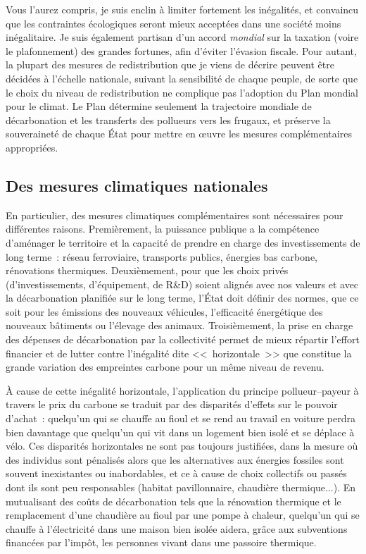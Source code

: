 \documentclass[a5paper,french,openany]{memoir}
\begin{document}
Vous l'aurez compris, je suis enclin à limiter fortement les inégalités, et convaincu que les contraintes écologiques seront mieux acceptées dans une société moins inégalitaire. Je suis également partisan d'un accord \textit{mondial} sur la taxation (voire le plafonnement) des grandes fortunes, afin d'éviter l'évasion fiscale. Pour autant, la plupart des mesures de redistribution que je viens de décrire peuvent être décidées à l'échelle nationale, suivant la sensibilité de chaque peuple, de sorte que le choix du niveau de redistribution ne complique pas l'adoption du Plan mondial pour le climat. Le Plan détermine seulement la trajectoire mondiale de décarbonation et les transferts des pollueurs vers les frugaux, et préserve la souveraineté de chaque État pour mettre en œuvre les mesures complémentaires appropriées.

\subsection{Des mesures climatiques nationales} %

En particulier, des mesures climatiques complémentaires sont nécessaires pour différentes raisons. Premièrement, la puissance publique a la compétence d'aménager le territoire et la capacité de prendre en charge des investissements de long terme~: réseau ferroviaire, transports publics, énergies bas carbone, rénovations thermiques. Deuxièmement, pour que les choix privés (d'investissements, d'équipement, de R\&D) soient alignés avec nos valeurs et avec la décarbonation planifiée sur le long terme, l'État doit définir des normes, que ce soit pour les émissions des nouveaux véhicules, l'efficacité énergétique des nouveaux bâtiments ou l'élevage des animaux. %
Troisièmement, la prise en charge des dépenses de décarbonation par la collectivité permet de mieux répartir l'effort financier et de lutter contre l'inégalité dite <<~horizontale~>> que constitue la grande variation des empreintes carbone pour un même niveau de revenu. %

À cause de cette inégalité horizontale, l'application du principe pollueur--payeur à travers le prix du carbone se traduit par des disparités d'effets sur le pouvoir d'achat~: quelqu'un qui se chauffe au fioul et se rend au travail en voiture perdra bien davantage que quelqu'un qui vit dans un logement bien isolé et se déplace à vélo. 
Ces disparités horizontales ne sont pas toujours justifiées, dans la mesure où des individus sont pénalisés alors que les alternatives aux énergies fossiles sont souvent inexistantes ou inabordables, et ce à cause de choix collectifs ou passés dont ils sont peu responsables (habitat pavillonnaire, chaudière thermique...). En mutualisant des coûts de décarbonation tels que la rénovation thermique et le remplacement d'une chaudière au fioul par une pompe à chaleur, quelqu'un qui se chauffe à l'électricité dans une maison bien isolée aidera, grâce aux subventions financées par l'impôt, les personnes vivant dans une passoire thermique. 
\end{document}
